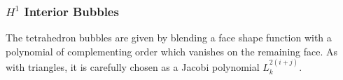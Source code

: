 


\subsubsection{\texorpdfstring{$H^1$}{H1} Interior Bubbles}

The tetrahedron bubbles are given by blending a face shape function with a polynomial of complementing order which vanishes on the remaining face. 
As with triangles, it is carefully chosen as a Jacobi polynomial $L_k^{2(i+j)}$. 


